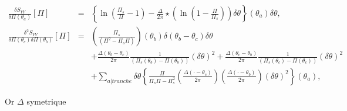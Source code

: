 	
		


		
%	
	
	
	\begin{eqnarray}
		\frac{ \delta S_{YY} }{ \delta \Pi(\theta_a)  } [\Pi ]  & = &    \left \{ \ln \left ( \frac{ \Pi_s }{ \Pi  } - 1 \right )   -  \frac{ \Delta}{2\pi}  \star \left ( \ln \left ( 1 - \frac{ \Pi}{ \Pi_s }\right ) \right ) \delta \theta \right \} (\theta_a) \delta \theta , \\
		\frac{ \delta^2 S_{YY} }{ \delta \Pi(\theta_c) \delta \Pi(\theta_b)  } [\Pi ]  & = &   \left (  \frac{\Pi_s}{(\Pi^2  - \Pi_s\Pi)}    \right )(\theta_b) \delta( \theta_b - \theta_c)  \delta \theta  \\
		&  &  +   \frac{ \Delta ( \theta_b - \theta_c)}{ 2\pi}  \frac{1 }{(\Pi_s(\theta_b) -\Pi(\theta_b)) } (\delta \theta)^2 +  \frac{\Delta ( \theta_c - \theta_b )}{2\pi}\frac{1 }{( \Pi_s(\theta_c)  -   \Pi(\theta_c) ) }(\delta \theta)^2  \\
		& & + \sum_{a \vert tranche}   \delta \theta \left \{  \frac{\Pi }{\Pi_s\Pi - \Pi_s^2 }\left (  \frac{\Delta ( \cdot - \theta_c )}{2\pi} \right )\left (  \frac{\Delta ( \cdot - \theta_b )}{2\pi} \right )( \delta \theta)^2  \right \}(\theta_a) ,	 	
	\end{eqnarray}
	
	

		
	Or $\Delta$ symetrique 
		
